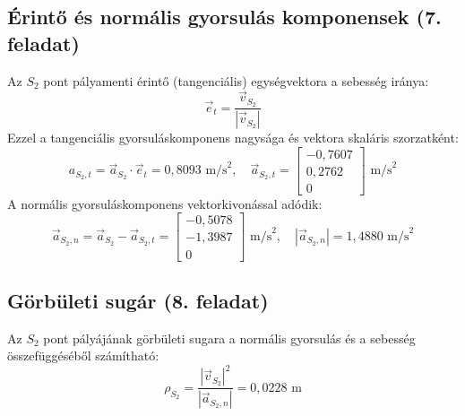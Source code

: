 \documentclass[fleqn,12pt]{article}
\begin{document}
\subsection{Érintő és normális gyorsulás komponensek (7. feladat)}
Az $S_2$ pont pályamenti érintő (tangenciális) egységvektora a sebesség iránya:
\begin{equation}
    \vec{e}_t = \frac{\vec{v}_{S_2}}{|\vec{v}_{S_2}|}
\end{equation}
Ezzel a tangenciális gyorsuláskomponens nagysága és vektora skaláris szorzatként:
\begin{equation}
    a_{S_2, t} = \vec{a}_{S_2} \cdot \vec{e}_t = 0,8093 \text{ m/s}^2, \quad \vec{a}_{S_2, t} = \begin{bmatrix} -0,7607 \\ 0,2762 \\ 0 \end{bmatrix} \text{ m/s}^2
\end{equation}
A normális gyorsuláskomponens vektorkivonással adódik:
\begin{equation}
    \vec{a}_{S_2, n} = \vec{a}_{S_2} - \vec{a}_{S_2, t} = \begin{bmatrix} -0,5078 \\ -1,3987 \\ 0 \end{bmatrix} \text{ m/s}^2, \quad |\vec{a}_{S_2, n}| = 1,4880 \text{ m/s}^2
\end{equation}

\subsection{Görbületi sugár (8. feladat)}
Az $S_2$ pont pályájának görbületi sugara a normális gyorsulás és a sebesség összefüggéséből számítható:
\begin{equation}
    \rho_{S_2} = \frac{|\vec{v}_{S_2}|^2}{|\vec{a}_{S_2, n}|} = 0,0228 \text{ m}
\end{equation}
\end{document}
